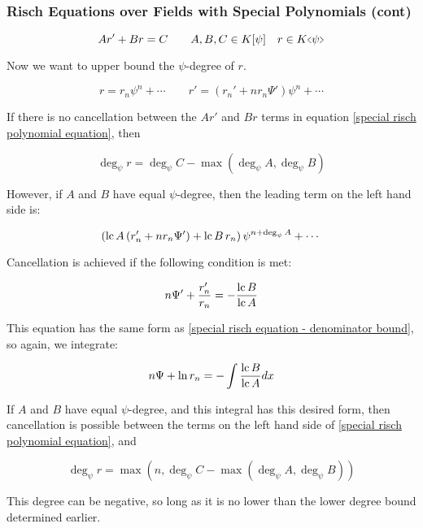 \documentclass[aspectratio=169,dvipsnames]{beamer}
\newcommand{\lc}{{\rm lc\,}}
\begin{document}
\begin{frame}[fragile]
\frametitle{Risch Equations over Fields with Special Polynomials (cont)}
\tiny
\begin{equation}
\label{special risch polynomial equation}
A r' + B r = C \qquad A,B,C \in K[\psi] \quad r \in K\hstretch{0.5}{<}\psi\hstretch{0.5}{>}
\end{equation}

Now we want to upper bound the $\psi$-degree of $r$.

$$r = r_n \psi^n + \cdots \qquad r' = (r_n' + n r_n \Psi') \psi^n + \cdots$$

If there is no cancellation between the $Ar'$ and $Br$ terms in equation \ref{special risch polynomial equation}, then

$$\deg_\psi r = \deg_\psi C - \max(\deg_\psi A, \deg_\psi B)$$

However, if $A$ and $B$ have equal $\psi$-degree, then the leading term on the left hand side is:

$$\left(\lc A\, (r_n' + n r_n \Psi') + \lc B\, r_n\right)\psi^{n+\deg_\psi A} + \cdots$$

Cancellation is achieved if the following condition is met:

\begin{equation}
\label{special risch equation - numerator bound}
n \Psi' + \frac{r_n'}{r_n} = - \frac{\lc B}{\lc A}
\end{equation}

This equation has the same form as \ref{special risch equation - denominator bound}, so again, we integrate:

\begin{equation}
\label{special risch equation - numerator bound}
n \Psi + \ln r_n = - \int \frac{\lc B}{\lc A} dx
\end{equation}

If $A$ and $B$ have equal $\psi$-degree, and this integral has this desired form, then cancellation
is possible between the terms on the left hand side of
\ref{special risch polynomial equation}, and

$$\deg_\psi r = \max(n, \deg_\psi C - \max(\deg_\psi A, \deg_\psi B))$$



This degree can be negative, so long as it is no lower than
the lower degree bound determined earlier.
\end{frame}
\end{document}
